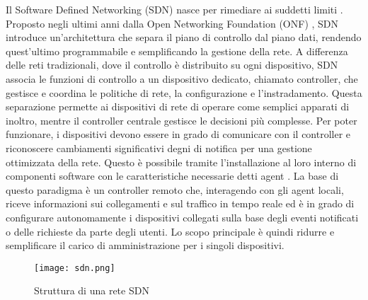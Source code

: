 \newline Il Software Defined Networking (SDN) nasce per rimediare ai suddetti limiti \cite{sdnsurvey}.
Proposto negli ultimi anni dalla Open Networking Foundation (ONF) \cite{ONF}, SDN introduce un'architettura che separa il piano di controllo dal piano dati, rendendo quest'ultimo programmabile e semplificando la gestione della rete. 
A differenza delle reti tradizionali, dove il controllo è distribuito su ogni dispositivo, SDN associa le funzioni di controllo a un dispositivo dedicato, chiamato controller, che gestisce e coordina le politiche di rete, la configurazione e l'instradamento.
Questa separazione permette ai dispositivi di rete di operare come semplici apparati di inoltro, mentre il controller centrale gestisce le decisioni più complesse. %
\newline Per poter funzionare, i dispositivi devono essere in grado di comunicare con il controller e riconoscere cambiamenti significativi degni di notifica per una gestione ottimizzata della rete. %
Questo è possibile tramite l'installazione al loro interno di componenti software con le caratteristiche necessarie
detti agent \cite{tesiSDN:2017}.
\newline La base di questo paradigma è un controller remoto che, interagendo con gli agent
locali, riceve informazioni sui collegamenti e sul traffico in tempo reale ed è in grado di
configurare autonomamente i dispositivi collegati sulla base degli eventi notificati o delle richieste da parte degli utenti. Lo scopo
principale è quindi ridurre e semplificare il carico di amministrazione per i singoli dispositivi.
\begin{figure}[h]
    \centering
   \texttt{[image: sdn.png]}
    \caption{Struttura di una rete SDN \cite{fotosdn}}
    \label{fig:sdnF}
\end{figure}
